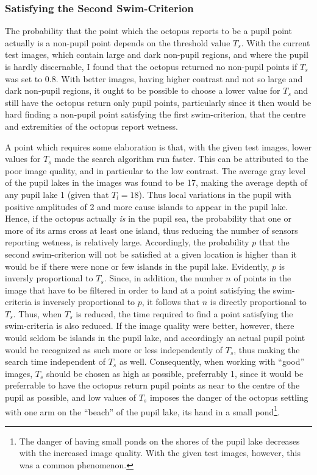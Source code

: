 
\subsubsection{Satisfying the Second Swim-Criterion}

The probability that the point which the octopus reports to be a pupil
point actually is a non-pupil point depends on the threshold value
$T_{s}$.  With the current test images, which contain large and dark
non-pupil regions, and where the pupil is hardly discernable, I found
that the octopus returned no non-pupil points if $T_{s}$ was set to
0.8.  With better images, having higher contrast and not so large and
dark non-pupil regions, it ought to be possible to choose a lower
value for $T_{s}$ and still have the octopus return only pupil points,
particularly since it then would be hard finding a non-pupil point
satisfying the first swim-criterion, that the centre and extremities
of the octopus report wetness.

A point which requires some elaboration is that, with the given test
images, lower values for $T_{s}$ made the search algorithm run faster.
This can be attributed to the poor image quality, and in particular to
the low contrast.  The average gray level of the pupil lakes in the
images was found to be 17, making the average depth of any pupil lake
1 (given that $T_{l}=18$).  Thus local variations in the pupil with
positive amplitudes of 2 and more cause islands to appear in the pupil
lake.  Hence, if the octopus actually {\em is\/} in the pupil sea, the
probability that one or more of its arms cross at least one island,
thus reducing the number of sensors reporting wetness, is relatively
large.  Accordingly, the probability $p$ that the second
swim-criterion will not be satisfied at a given location is higher
than it would be if there were none or few islands in the pupil lake.
Evidently, $p$ is inversly proportional to $T_{s}$.  Since, in
addition, the number $n$ of points in the image that have to be
filtered in order to land at a point satisfying the swim-criteria is
inversely proportional to $p$, it follows that $n$ is directly
proportional to $T_{s}$.  Thus, when $T_{s}$ is reduced, the time
required to find a point satisfying the swim-criteria is also reduced.
If the image quality were better, however, there would seldom be
islands in the pupil lake, and accordingly an actual pupil point would
be recognized as such more or less independently of $T_{s}$, thus
making the search time independent of $T_{s}$ as well.  Consequently,
when working with ``good'' images, $T_{s}$ should be chosen as high as
possible, preferrably 1, since it would be preferrable to have the
octopus return pupil points as near to the centre of the pupil as
possible, and low values of $T_{s}$ imposes the danger of the octopus
settling with one arm on the ``beach'' of the pupil lake, its hand in
a small pond\footnote{The danger of having small ponds on the shores
  of the pupil lake decreases with the increased image quality.  With
  the given test images, however, this was a common phenomenon.}.


